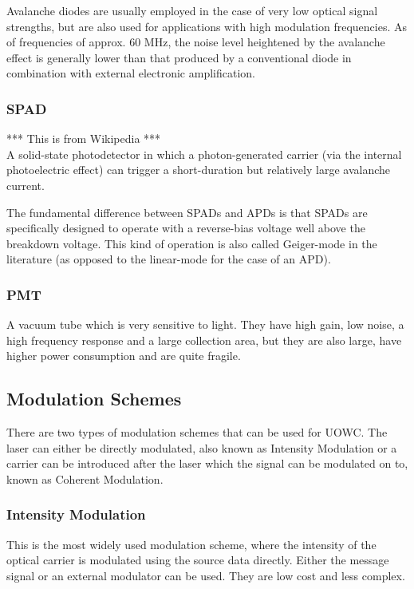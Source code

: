 Avalanche diodes are usually employed in the case of very low optical signal
strengths, but are also used for applications with high modulation frequencies.
As of frequencies of approx. 60 MHz, the noise level heightened by the
avalanche effect is generally lower than that produced by a conventional diode
in combination with external electronic amplification.

\subsubsection{\ac{SPAD}}
*** This is from Wikipedia ***\\
A solid-state photodetector in which a photon-generated carrier (via the
internal photoelectric effect) can trigger a short-duration but relatively
large avalanche current.

The fundamental difference between SPADs and APDs is that SPADs are
specifically designed to operate with a reverse-bias voltage well above the
breakdown voltage. This kind of operation is also called Geiger-mode in the
literature (as opposed to the linear-mode for the case of an APD).

\subsubsection{\ac{PMT}}
A vacuum tube which is very sensitive to light. They have high gain, low noise,
a high frequency response and a large collection area, but they are also large,
have higher power consumption and are quite fragile.

\subsection{Modulation Schemes}
There are two types of modulation schemes that can be used for \ac{UOWC}.
The laser can either be directly modulated, also known as Intensity Modulation
or a carrier can be introduced after the laser which the signal can be
modulated on to, known as Coherent Modulation.

\subsubsection{Intensity Modulation}
This is the most widely used modulation scheme, where the intensity of the
optical carrier is modulated using the source data directly. Either the
message signal or an external modulator can be used. They are low cost and
less complex.

